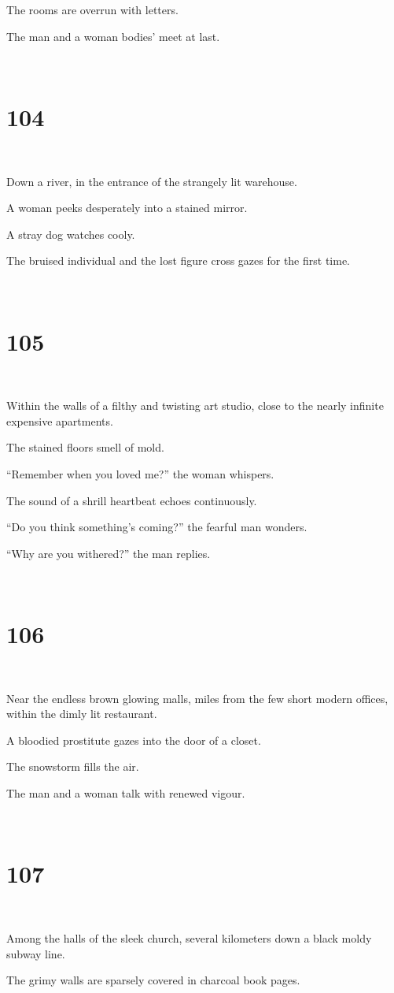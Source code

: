 \documentclass{report}
\begin{document}
The rooms are overrun with letters.

The man and a woman bodies' meet at last.

~
\chapter*{104}
~

Down a river, in the entrance of the strangely lit warehouse.

A woman peeks desperately into a stained mirror.

A stray dog watches cooly.

The bruised individual and the lost figure cross gazes for the first time.

~
\chapter*{105}
~

Within the walls of a filthy and twisting art studio, close to the nearly infinite expensive apartments.

The stained floors smell of mold.

``Remember when you loved me?'' the woman whispers.

The sound of a shrill heartbeat echoes continuously.

``Do you think something's coming?'' the fearful man wonders.

``Why are you withered?'' the man replies.

~
\chapter*{106}
~

Near the endless brown glowing malls, miles from the few short modern offices, within the dimly lit restaurant.

A bloodied prostitute gazes into the door of a closet.

The snowstorm fills the air.

The man and a woman talk with renewed vigour.

~
\chapter*{107}
~

Among the halls of the sleek church, several kilometers down a black moldy subway line.

The grimy walls are sparsely covered in charcoal book pages.
\end{document}
